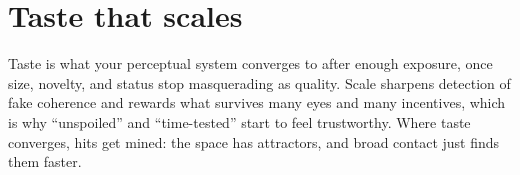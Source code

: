 \part{Taste that scales}
\epigraph{Taste is what your perceptual system converges to after enough exposure, once size, novelty, and status stop masquerading as quality. Scale sharpens detection of fake coherence and rewards what survives many eyes and many incentives, which is why ``unspoiled'' and ``time-tested'' start to feel trustworthy. Where taste converges, hits get mined: the space has attractors, and broad contact just finds them faster.}{}
\clearpage
